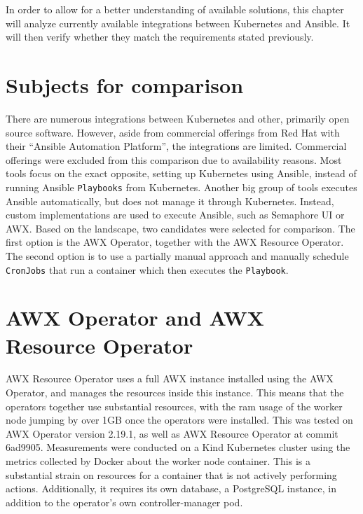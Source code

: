 In order to allow for a better understanding of available solutions, this chapter will analyze currently available integrations between Kubernetes and Ansible.
It will then verify whether they match the requirements stated previously.

\section{Subjects for comparison}
There are numerous integrations between Kubernetes and other, primarily open source software.
However, aside from commercial offerings from Red Hat with their \enquote{Ansible Automation Platform}, the integrations are limited.
Commercial offerings were excluded from this comparison due to availability reasons.
Most tools focus on the exact opposite, setting up Kubernetes using Ansible, instead of running Ansible \texttt{Playbooks} from Kubernetes.
Another big group of tools executes Ansible automatically, but does not manage it through Kubernetes.
Instead, custom implementations are used to execute Ansible, such as Semaphore UI or AWX.
Based on the landscape, two candidates were selected for comparison.
The first option is the AWX Operator, together with the AWX Resource Operator.
The second option is to use a partially manual approach and manually schedule \texttt{CronJobs} that run a container which then executes the \texttt{Playbook}.

\clearpage
\section{AWX Operator and AWX Resource Operator}
AWX Resource Operator uses a full AWX instance installed using the AWX Operator, and manages the resources inside this instance.
This means that the operators together use substantial resources, with the \gls{ram} usage of the worker node jumping by over 1GB once the operators were installed.
This was tested on AWX Operator version 2.19.1, as well as AWX Resource Operator at commit 6ad9905.
Measurements were conducted on a Kind Kubernetes cluster using the metrics collected by Docker about the worker node container.
This is a substantial strain on resources for a container that is not actively performing actions.
Additionally, it requires its own database, a PostgreSQL instance, in addition to the operator's own controller-manager \gls{pod}.

